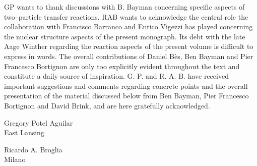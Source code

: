 GP wants to thank discussions with B. Bayman concerning specific aspects of two--particle transfer reactions.
RAB wants to acknowledge the central role the collaboration with Francisco Barranco and Enrico Vigezzi has played concerning the nuclear structure aspects of the present monograph. Its debt with the late Aage Winther regarding the reaction aspects of the present volume is difficult to express in words. The overall contributions of Daniel B\`{e}s, Ben Bayman and Pier Francesco Bortignon are only too explicitly evident throughout the text and constitute a daily source of inspiration.  G. P. and R. A. B. have received important suggestions and comments regarding concrete points and the overall presentation of the material discussed below from Ben Bayman, Pier Francesco Bortignon and David Brink, and are here gratefully acknowledged.
\begin{flushleft}
Gregory Potel Aguilar\\
 East Lansing
\end{flushleft}
\vspace{-1.7cm}
\begin{flushright}
Ricardo A. Broglia\\
 Milano
\end{flushright}



% 
 
